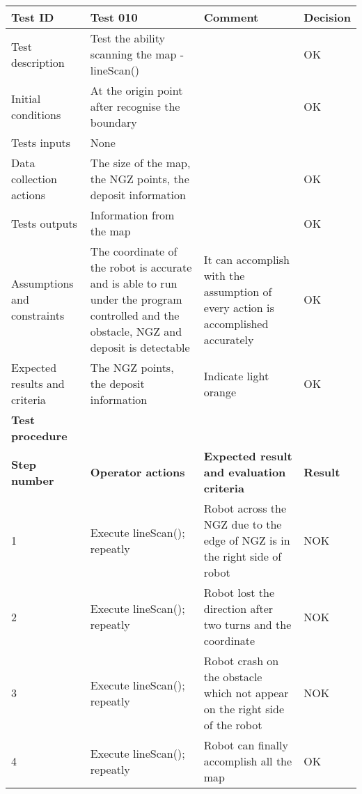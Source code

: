 \documentclass[11pt, a4paper]{article}
\begin{document}
\begin{tabular} 
	 {|p{4cm}|p{4.5cm}|p{4.5cm}|p{1.5cm}|}
\hline
\textbf{Test ID} & \textbf{Test 010} & \textbf{Comment} & \textbf{Decision}\\
\hline
{Test description} & {Test the ability scanning the map - lineScan()} & {} & {OK}\\
\hline
{Initial conditions} & {At the origin point after \newline recognise the boundary} & {} & {OK}\\
\hline
{Tests inputs} & {None} & {} & {}\\
\hline
{Data collection actions} & {The size of the map, the NGZ points, the deposit information} & {} & {OK}\\
\hline
{Tests outputs} & {Information from the map} & {} & {OK}\\
\hline
{Assumptions and constraints} & {The coordinate of the robot is accurate and is able to run \newline under the program controlled and the obstacle, NGZ and \newline deposit is detectable} & {It can accomplish with the \newline assumption of every action is accomplished accurately} & {OK}\\
\hline
{Expected results and criteria} & {The NGZ points, the deposit \newline information} & {Indicate light orange} & {OK}\\
\hline
\textbf{Test procedure} & \textbf{} & \textbf{} & \textbf{}\\
\hline
\textbf{Step number} & \textbf{Operator actions} & \textbf{Expected result and \newline evaluation criteria} & \textbf{Result}\\
\hline
{1} & {Execute \newline lineScan(); \newline repeatly} & {Robot across the NGZ due to the edge of NGZ is in the right side of robot} & {NOK}\\
\hline
{2} & {Execute \newline lineScan(); \newline repeatly} & {Robot lost the direction after two turns and the coordinate} & {NOK}\\
\hline
{3} & {Execute \newline lineScan(); \newline repeatly} & {Robot crash on the obstacle which not appear on the right side of the robot} & {NOK}\\
\hline
{4} & {Execute \newline lineScan(); \newline repeatly} & {Robot can finally accomplish all the map} & {OK}\\
\hline
\end{tabular}
\newpage
\end{document}
